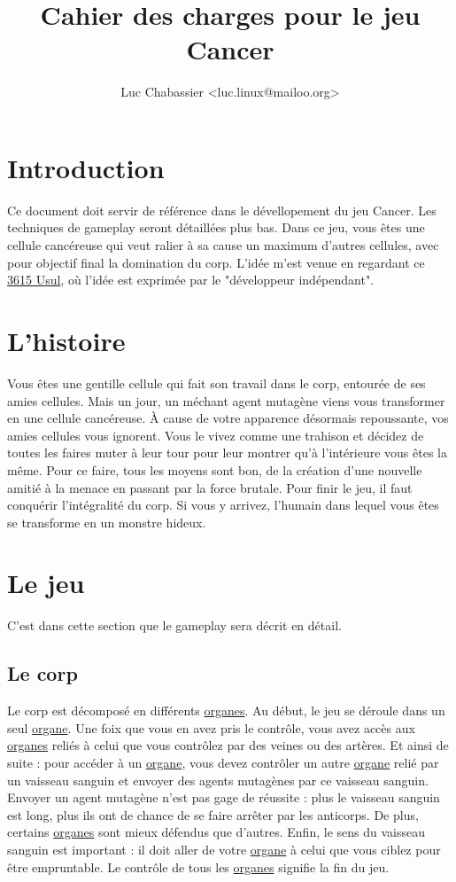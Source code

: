 \documentclass{article}
\title{Cahier des charges pour le jeu Cancer}
\author{Luc Chabassier <luc.linux@mailoo.org>}
\begin{document}
\maketitle

\tableofcontents

\section{Introduction}
Ce document doit servir de référence dans le dévellopement du jeu Cancer. Les techniques de gameplay seront détaillées plus bas. Dans ce jeu, vous êtes une cellule cancéreuse qui veut ralier à sa cause un maximum d'autres cellules, avec pour objectif final la domination du corp. L'idée m'est venue en regardant ce \href{http://www.jeuxvideo.com/chroniques-video/00000345/3615-usul-jeux-inde-00000217.htm}{3615 Usul}, où l'idée est exprimée par le "développeur indépendant".

\section{L'histoire}
Vous êtes une gentille cellule qui fait son travail dans le corp, entourée de ses amies cellules. Mais un jour, un méchant agent mutagène viens vous transformer en une cellule cancéreuse. À cause de votre apparence désormais repoussante, vos amies cellules vous ignorent. Vous le vivez comme une trahison et décidez de toutes les faires muter à leur tour pour leur montrer qu'à l'intérieure vous êtes la même. Pour ce faire, tous les moyens sont bon, de la création d'une nouvelle amitié à la menace en passant par la force brutale. Pour finir le jeu, il faut conquérir l'intégralité du corp. Si vous y arrivez, l'humain dans lequel vous êtes se transforme en un monstre hideux.

\section{Le jeu}
C'est dans cette section que le gameplay sera décrit en détail.

\subsection{Le corp}\label{corp}
Le corp est décomposé en différents \hyperref[organe]{organes}. Au début, le jeu se déroule dans un seul \hyperref[organe]{organe}. Une foix que vous en avez pris le contrôle, vous avez accès aux \hyperref[organe]{organes} reliés à celui que vous contrôlez par des veines ou des artères. Et ainsi de suite : pour accéder à un \hyperref[organe]{organe}, vous devez contrôler un autre \hyperref[organe]{organe} relié par un vaisseau sanguin et envoyer des agents mutagènes par ce vaisseau sanguin. Envoyer un agent mutagène n'est pas gage de réussite : plus le vaisseau sanguin est long, plus ils ont de chance de se faire arrêter par les anticorps. De plus, certains \hyperref[organe]{organes} sont mieux défendus que d'autres. Enfin, le sens du vaisseau sanguin est important : il doit aller de votre \hyperref[organe]{organe} à celui que vous ciblez pour être empruntable. Le contrôle de tous les \hyperref[organe]{organes} signifie la fin du jeu.
\end{document}
